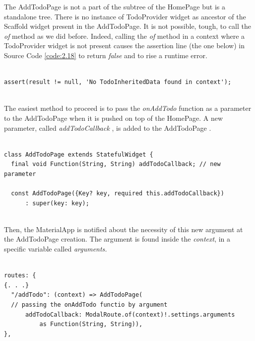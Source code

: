 The AddTodoPage is not a part of the subtree of the HomePage but is a standalone tree. There is no instance of TodoProvider widget as ancestor of the  Scaffold widget present in the AddTodoPage. It is not possible, tough, to call the \textit{of} method as  we did before. Indeed, calling the \textit{of} method in a context where a TodoProvider widget is not present causes the assertion line (the one below) in Source Code \ref{code:2.18} to return \textit{false} and to rise a runtime error.
\mbox{}\\

\begin{code}
\begin{verbatim}

assert(result != null, 'No TodoInheritedData found in context');
\end{verbatim}
\end{code}
\mbox{}\\
The easiest method to proceed is to pass the \textit{onAddTodo} function as a parameter to the AddTodoPage when it is pushed on top of the HomePage. A new parameter, called \textit{addTodoCallback }, is added to the AddTodoPage .
\mbox{}\\
\mbox{}
\begin{code}
\label{code:2.34}
\begin{verbatim}

class AddTodoPage extends StatefulWidget {
  final void Function(String, String) addTodoCallback; // new parameter

  const AddTodoPage({Key? key, required this.addTodoCallback})
      : super(key: key);
\end{verbatim}
\end{code}
\mbox{}\\
Then, the MaterialApp is notified about the necessity of this new argument at the AddTodoPage creation. The argument is found inside the \textit{context}, in a specific variable called \textit{arguments.}
\mbox{}\\
\mbox{}
\begin{code}
\label{code:2.36}
\begin{verbatim}

routes: {
{. . .}
  "/addTodo": (context) => AddTodoPage( 
  // passing the onAddTodo functio by argument
      addTodoCallback: ModalRoute.of(context)!.settings.arguments
          as Function(String, String)),
},

\end{verbatim}
\end{code}
